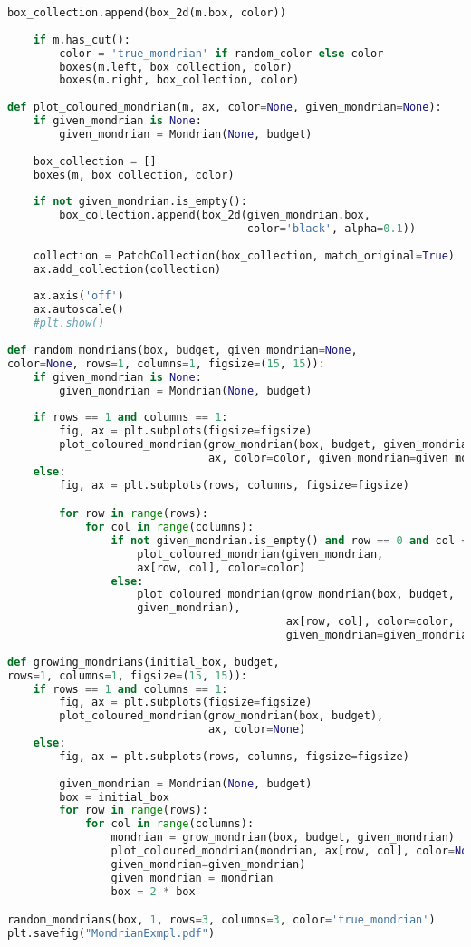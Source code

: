 \begin{lstlisting}[language=Python]
    box_collection.append(box_2d(m.box, color))
    
    if m.has_cut():
        color = 'true_mondrian' if random_color else color
        boxes(m.left, box_collection, color)
        boxes(m.right, box_collection, color)
        
def plot_coloured_mondrian(m, ax, color=None, given_mondrian=None):
    if given_mondrian is None:
        given_mondrian = Mondrian(None, budget)
        
    box_collection = []
    boxes(m, box_collection, color)
    
    if not given_mondrian.is_empty():
        box_collection.append(box_2d(given_mondrian.box, 
                                     color='black', alpha=0.1))
        
    collection = PatchCollection(box_collection, match_original=True)
    ax.add_collection(collection)
    
    ax.axis('off')
    ax.autoscale()
    #plt.show()
    
def random_mondrians(box, budget, given_mondrian=None, 
color=None, rows=1, columns=1, figsize=(15, 15)):
    if given_mondrian is None:
        given_mondrian = Mondrian(None, budget)
        
    if rows == 1 and columns == 1:
        fig, ax = plt.subplots(figsize=figsize)  
        plot_coloured_mondrian(grow_mondrian(box, budget, given_mondrian), 
                               ax, color=color, given_mondrian=given_mondrian)
    else:
        fig, ax = plt.subplots(rows, columns, figsize=figsize)  

        for row in range(rows):
            for col in range(columns):
                if not given_mondrian.is_empty() and row == 0 and col ==0:
                    plot_coloured_mondrian(given_mondrian, 
                    ax[row, col], color=color)
                else:
                    plot_coloured_mondrian(grow_mondrian(box, budget,
                    given_mondrian), 
                                           ax[row, col], color=color,
                                           given_mondrian=given_mondrian)
                    
def growing_mondrians(initial_box, budget, 
rows=1, columns=1, figsize=(15, 15)):
    if rows == 1 and columns == 1:
        fig, ax = plt.subplots(figsize=figsize)  
        plot_coloured_mondrian(grow_mondrian(box, budget), 
                               ax, color=None)
    else:
        fig, ax = plt.subplots(rows, columns, figsize=figsize)  
        
        given_mondrian = Mondrian(None, budget)
        box = initial_box
        for row in range(rows):
            for col in range(columns):
                mondrian = grow_mondrian(box, budget, given_mondrian)
                plot_coloured_mondrian(mondrian, ax[row, col], color=None,
                given_mondrian=given_mondrian)
                given_mondrian = mondrian
                box = 2 * box    

random_mondrians(box, 1, rows=3, columns=3, color='true_mondrian')
plt.savefig("MondrianExmpl.pdf")
\end{lstlisting}
